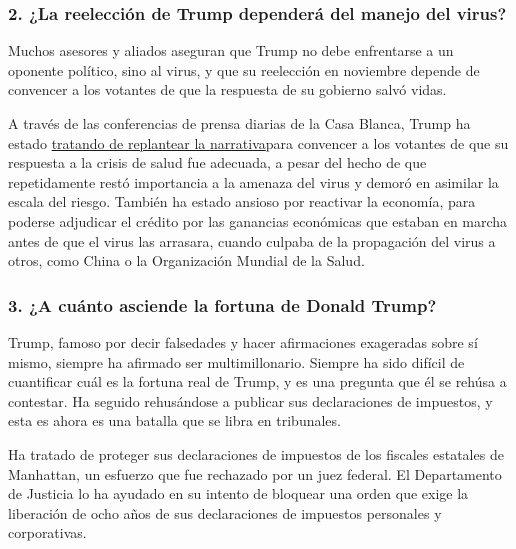 \hypertarget{2-la-reelecciuxf3n-de-trump-dependeruxe1-del-manejo-del-virus}{%
\subsubsection{\texorpdfstring{\textbf{2. ¿La reelección de Trump
dependerá del manejo del
virus?}}{2. ¿La reelección de Trump dependerá del manejo del virus?}}\label{2-la-reelecciuxf3n-de-trump-dependeruxe1-del-manejo-del-virus}}

Muchos asesores y aliados aseguran que Trump no debe enfrentarse a un
oponente político, sino al virus, y que su reelección en noviembre
depende de convencer a los votantes de que la respuesta de su gobierno
salvó vidas.

A través de las conferencias de prensa diarias de la Casa Blanca, Trump
ha estado
\href{https://www.nytimes3xbfgragh.onion/interactive/2020/04/26/us/politics/trump-coronavirus-briefings-analyzed.html}{tratando
de replantear la narrativa}para convencer a los votantes de que su
respuesta a la crisis de salud fue adecuada, a pesar del hecho de que
repetidamente restó importancia a la amenaza del virus y demoró en
asimilar la escala del riesgo. También ha estado ansioso por reactivar
la economía, para poderse adjudicar el crédito por las ganancias
económicas que estaban en marcha antes de que el virus las arrasara,
cuando culpaba de la propagación del virus a otros, como China o la
Organización Mundial de la Salud.

\hypertarget{3-a-cuuxe1nto-asciende-la-fortuna-de-donald-trump}{%
\subsubsection{\texorpdfstring{\textbf{3. ¿A cuánto asciende la fortuna
de Donald
Trump?}}{3. ¿A cuánto asciende la fortuna de Donald Trump?}}\label{3-a-cuuxe1nto-asciende-la-fortuna-de-donald-trump}}

Trump, famoso por decir falsedades y hacer afirmaciones exageradas sobre
sí mismo, siempre ha afirmado ser multimillonario. Siempre ha sido
difícil de cuantificar cuál es la fortuna real de Trump, y es una
pregunta que él se rehúsa a contestar. Ha seguido rehusándose a publicar
sus declaraciones de impuestos, y esta es ahora es una batalla que se
libra en tribunales.

Ha tratado de proteger sus declaraciones de impuestos de los fiscales
estatales de Manhattan, un esfuerzo que fue rechazado por un juez
federal. El Departamento de Justicia lo ha ayudado en su intento de
bloquear una orden que exige la liberación de ocho años de sus
declaraciones de impuestos personales y corporativas.

